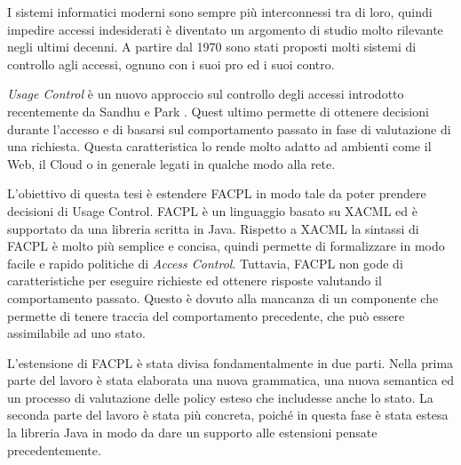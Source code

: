 I sistemi informatici moderni sono sempre più interconnessi tra di loro, quindi
impedire accessi indesiderati è diventato un argomento di studio molto rilevante negli ultimi decenni.
A partire dal 1970 sono stati proposti molti sistemi di controllo agli accessi, ognuno con i suoi pro ed i suoi contro.\par
\textit{Usage Control} è un nuovo approccio sul controllo degli accessi
introdotto recentemente da Sandhu e Park \cite{ucon}.
Quest ultimo permette di ottenere decisioni durante
l’accesso e di basarsi sul comportamento passato in fase di valutazione
di una richiesta. Questa caratteristica lo rende molto adatto ad ambienti come il Web,
il Cloud o in generale legati in qualche modo alla rete. \par
L'obiettivo di questa tesi è estendere \ac{FACPL} in modo tale da poter prendere decisioni 
di Usage Control.
\ac{FACPL} è un linguaggio basato su \ac{XACML} ed è supportato da una libreria
scritta in Java. Rispetto a \ac{XACML} la sintassi di \ac{FACPL} è molto più semplice
e concisa, quindi permette di formalizzare in modo facile e rapido
politiche di \textit{Access Control}. 
Tuttavia, \ac{FACPL} non gode di caratteristiche
per eseguire richieste ed ottenere risposte valutando il comportamento passato. Questo è dovuto alla mancanza di un componente che permette di tenere traccia del comportamento precedente, che può essere assimilabile ad uno stato.\par
L'estensione di \ac{FACPL} è stata divisa fondamentalmente in due parti. 
Nella prima parte del lavoro è stata elaborata una nuova grammatica, una nuova semantica ed un processo di valutazione delle policy esteso che includesse anche lo stato.
La seconda parte del lavoro è stata più concreta, poiché in questa fase è stata estesa la libreria Java in modo da dare un supporto alle estensioni pensate precedentemente. \par



